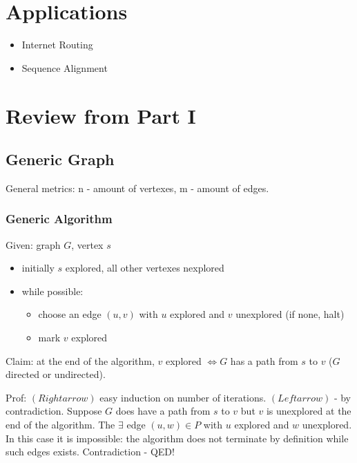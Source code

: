 \documentclass{scrartcl}
\begin{document}
\section {Applications}
\label{sec:Section1}
\begin{itemize}
\item Internet Routing
\item Sequence Alignment
\end{itemize}

\section{Review from Part I}
\label{sec:Section2}
\subsection{Generic Graph}
\label{Graphs}
General metrics: n - amount of vertexes, m - amount of edges.

\subsubsection{Generic Algorithm}
\label{sec:Genericlgorithm}
Given: graph $G$, vertex $s$
\begin{itemize}
\item initially $s$ explored, all other vertexes nexplored
\item while possible:
  \begin{itemize}
  \item choose an edge $(u, v)$ with $u$ explored and $v$ unexplored (if none,
    halt)
  \item mark $v$ explored
  \end{itemize}
\end{itemize}

Claim: at the end of the algorithm, $v$ explored $\Leftrightarrow G$ has a path
from $s$ to $v$ ($G$ directed or undirected).

Prof: $(Rightarrow)$ easy induction on number of iterations. $(Leftarrow)$ - by
contradiction. Suppose $G$ does have a path from $s$ to $v$ but $v$ is
unexplored at the end of the algorithm. The $\exists$ edge $(u, w) \in P$ with
$u$ explored and $w$ unexplored. In this case it is impossible: the algorithm
does not terminate by definition while such edges exists. Contradiction - QED!
\end{document}
